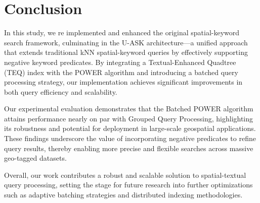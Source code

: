 \documentclass[conference]{IEEEtran}
\begin{document}
\section{Conclusion}

In this study, we re implemented and enhanced the original spatial-keyword search framework, culminating in the U-ASK architecture---a unified approach that extends traditional kNN spatial-keyword queries by effectively supporting negative keyword predicates. By integrating a Textual-Enhanced Quadtree (TEQ) index with the POWER algorithm and introducing a batched query processing strategy, our implementation achieves significant improvements in both query efficiency and scalability.

Our experimental evaluation demonstrates that the Batched POWER algorithm attains performance nearly on par with Grouped Query Processing, highlighting its robustness and potential for deployment in large-scale geospatial applications. These findings underscore the value of incorporating negative predicates to refine query results, thereby enabling more precise and flexible searches across massive geo-tagged datasets.

Overall, our work contributes a robust and scalable solution to spatial-textual query processing, setting the stage for future research into further optimizations such as adaptive batching strategies and distributed indexing methodologies.

 
\end{document}
